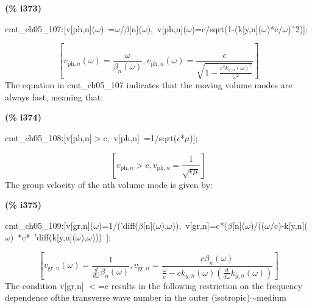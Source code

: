 \documentclass[fleqn]{article}
\begin{document}
\noindent
\begin{minipage}[t]{4.000000em}\color{red}\bfseries
(\% i373)	
\end{minipage}
\begin{minipage}[t]{\textwidth}\color{blue}
cmt\_ch05\_107:[v[ph,n](\ensuremath{\omega})\ =\ensuremath{\omega}/\ensuremath{\beta}[n](\ensuremath{\omega}),\ v[ph,n](\ensuremath{\omega})=c/sqrt(1-(k[y,n](\ensuremath{\omega})*c/\ensuremath{\omega})\^\ 2)];
\end{minipage}
\[\displaystyle \tag{\% o373} 
\left[ {v_{\ensuremath{\mathrm{ph}},n}}\left( \omega \right) =\frac{\omega }{{{\beta }_n}\left( \omega \right) }\operatorname{,}{v_{\ensuremath{\mathrm{ph}},n}}\left( \omega \right) =\frac{c}{\sqrt{1-\frac{{{c}^{2}} {{{k_{y,n}}\left( \omega \right) }^{2}}}{{{\omega }^{2}}}}}\right] \mbox{}
\]
The equation in cmt\_ch05\_107 indicates that the moving volume modes are always fast, meaning that:


\noindent
\begin{minipage}[t]{4.000000em}\color{red}\bfseries
(\% i374)	
\end{minipage}
\begin{minipage}[t]{\textwidth}\color{blue}
cmt\_ch05\_108:[v[ph,n]\ensuremath{>}c,\ v[ph,n]\ =1/sqrt(\ensuremath{\epsilon}*\ensuremath{\mu})];
\end{minipage}
\[\displaystyle \tag{\% o374} 
\left[ {v_{\ensuremath{\mathrm{ph}},n}}\operatorname{>  }c\operatorname{,}{v_{\ensuremath{\mathrm{ph}},n}}=\frac{1}{\sqrt{\epsilon  \mu }}\right] \mbox{}
\]
The group velocity of the nth volume mode is given by:


\noindent
\begin{minipage}[t]{4.000000em}\color{red}\bfseries
(\% i375)	
\end{minipage}
\begin{minipage}[t]{\textwidth}\color{blue}
cmt\_ch05\_109:[v[gr,n](\ensuremath{\omega})=1/('diff(\ensuremath{\beta}[n](\ensuremath{\omega}),\ensuremath{\omega})),\ v[gr,n]=c*(\ensuremath{\beta}[n](\ensuremath{\omega})/((\ensuremath{\omega}/c)-k[y,n](\ensuremath{\omega})\ *c*\ 'diff(k[y,n](\ensuremath{\omega}),\ensuremath{\omega})))\ ];
\end{minipage}
\[\displaystyle \tag{\% o375} 
\left[ {v_{\ensuremath{\mathrm{gr}},n}}\left( \omega \right) =\frac{1}{\frac{d}{d \omega } {{\beta }_n}\left( \omega \right) }\operatorname{,}{v_{\ensuremath{\mathrm{gr}},n}}=\frac{c {{\beta }_n}\left( \omega \right) }{\frac{\omega }{c}-c {k_{y,n}}\left( \omega \right)  \left( \frac{d}{d \omega } {k_{y,n}}\left( \omega \right) \right) }\right] \mbox{}
\]
The condition v[gr,n] \ensuremath{<}=c results in the following restriction on the frequency dependence ofthe transverse wave number in the outer (isotropic)\ensuremath{\sim }medium
\end{document}
